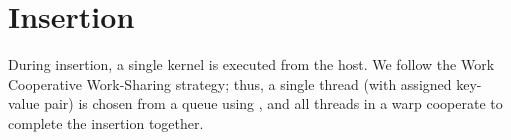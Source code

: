 \section{Insertion}

During insertion, a single kernel is executed from the host. We follow the Work Cooperative Work-Sharing strategy; thus, a single thread (with assigned key-value pair) is chosen from a queue using , and all threads in a warp cooperate to complete the insertion together.



